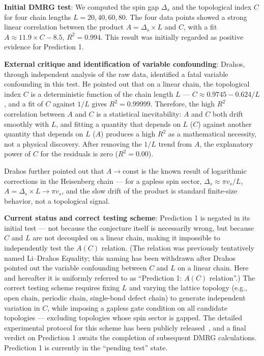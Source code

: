 \documentclass[prb,reprint,twocolumn,superscriptaddress]{revtex4-2}
\begin{document}
\textbf{Initial DMRG test}: We computed the spin gap $\Delta_s$ and the topological index $C$ for four chain lengths $L = 20, 40, 60, 80$. The four data points showed a strong linear correlation between the product $A = \Delta_s \times L$ and $C$, with a fit $A \approx 11.9 \times C - 8.5$, $R^2 = 0.994$. This result was initially regarded as positive evidence for Prediction 1.

\textbf{External critique and identification of variable confounding}: Drahos, through independent analysis of the raw data, identified a fatal variable confounding in this test. He pointed out that on a linear chain, the topological index $C$ is a deterministic function of the chain length $L$ --- $C \approx 0.9745 - 0.624/L$, and a fit of $C$ against $1/L$ gives $R^2 = 0.99999$. Therefore, the high $R^2$ correlation between $A$ and $C$ is a statistical inevitability: $A$ and $C$ both drift smoothly with $L$, and fitting a quantity that depends on $L$ ($C$) against another quantity that depends on $L$ ($A$) produces a high $R^2$ as a mathematical necessity, not a physical discovery. After removing the $1/L$ trend from $A$, the explanatory power of $C$ for the residuals is zero ($R^2 = 0.00$).

Drahos further pointed out that $A \to \text{const}$ is the known result of logarithmic corrections in the Heisenberg chain --- for a gapless spin sector, $\Delta_s \approx \pi v_s/L$, $A = \Delta_s \times L \to \pi v_s$, and the slow drift of the product is standard finite-size behavior, not a topological signal.

\textbf{Current status and correct testing scheme}: Prediction 1 is negated in its initial test --- not because the conjecture itself is necessarily wrong, but because $C$ and $L$ are not decoupled on a linear chain, making it impossible to independently test the $A(C)$ relation. (The relation was previously tentatively named Li--Drahos Equality; this naming has been withdrawn after Drahos pointed out the variable confounding between $C$ and $L$ on a linear chain. Here and hereafter it is uniformly referred to as ``Prediction 1: $A(C)$ relation''.) The correct testing scheme requires fixing $L$ and varying the lattice topology (e.g., open chain, periodic chain, single-bond defect chain) to generate independent variation in $C$, while imposing a gapless gate condition on all candidate topologies --- excluding topologies whose spin sector is gapped. The detailed experimental protocol for this scheme has been publicly released~\cite{Li2026GitHub}, and a final verdict on Prediction 1 awaits the completion of subsequent DMRG calculations. Prediction 1 is currently in the ``pending test'' state.
\end{document}
